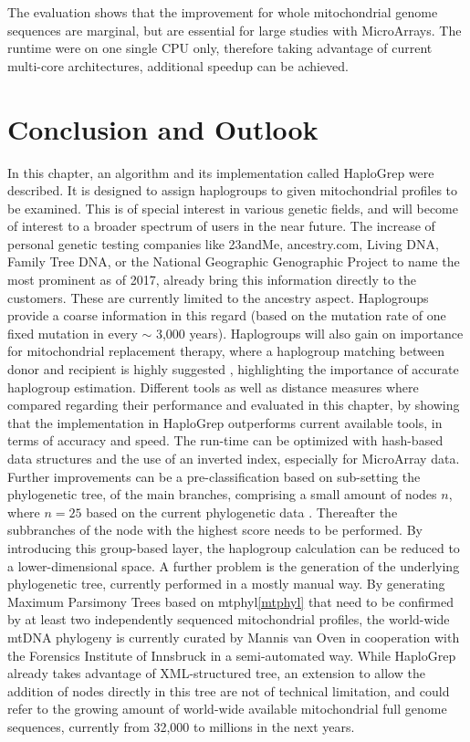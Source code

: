 The evaluation shows that the improvement for whole mitochondrial genome sequences are marginal, but are essential for large studies with MicroArrays. The runtime were on one single CPU only, therefore taking advantage of current multi-core architectures, additional speedup can be achieved. 

\section{Conclusion and Outlook}\label{hg:outlook}
In this chapter, an algorithm and its implementation called HaploGrep were described. It is designed to assign haplogroups to given mitochondrial profiles to be examined. This is of special interest in various genetic fields, and will become of interest to a broader spectrum of users in the near future. The increase of personal genetic testing companies like 23andMe, ancestry.com, Living DNA, Family Tree DNA, or the National Geographic Genographic Project to name the most prominent as of 2017, already bring this information directly to the customers. These are currently limited to the ancestry aspect. Haplogroups provide a coarse information in this regard (based on the mutation rate of one fixed mutation in every $\sim$ 3,000 years). Haplogroups will also gain on importance for mitochondrial replacement therapy, where a haplogroup matching between donor and recipient is highly suggested \cite{Royrvik2016}, highlighting the importance of accurate haplogroup estimation. Different tools as well as distance measures where compared regarding their performance and evaluated in this chapter, by showing that the implementation in HaploGrep outperforms current available tools, in terms of accuracy and speed. The run-time can be optimized with hash-based data structures and the use of an inverted index, especially for MicroArray data. Further improvements can be a pre-classification based on sub-setting the phylogenetic tree, of the main branches, comprising a small amount of nodes $n$, where $n = 25$ based on the current phylogenetic data \cite{VanOven2015}. Thereafter the subbranches of the node with the highest score needs to be performed. By introducing this group-based layer, the haplogroup calculation can be reduced to a lower-dimensional space. A further problem is the generation of the underlying phylogenetic tree, currently performed in a mostly manual way. By generating Maximum Parsimony Trees based on mtphyl\ref{mtphyl} that need to be confirmed by at least two independently sequenced mitochondrial profiles, the world-wide mtDNA phylogeny is currently curated by Mannis van Oven \cite{VanOven2015} in cooperation with the Forensics Institute of Innsbruck in a semi-automated way. While HaploGrep already takes advantage of XML-structured tree, an extension to allow the addition of nodes directly in this tree are not of technical limitation, and could refer to the growing amount of world-wide available mitochondrial full genome sequences, currently from 32,000 to millions in the next years.

